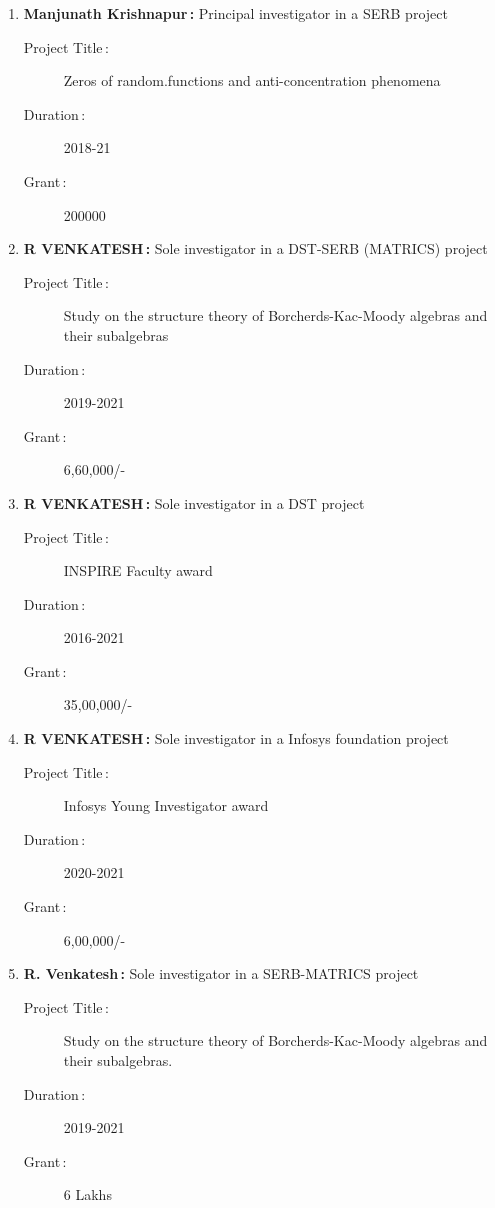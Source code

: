 \begin{enumerate}
\item {\bf Manjunath Krishnapur\,:} Principal investigator in a SERB project
\begin{description}
  \item[Project Title\,:] Zeros of random.functions and anti-concentration phenomena
  \item[Duration\,:] 2018-21
  \item[Grant\,:] 200000
\end{description}


\item {\bf R VENKATESH\,:} Sole investigator in a DST-SERB (MATRICS) project
\begin{description}
  \item[Project Title\,:] Study on the structure theory of Borcherds-Kac-Moody algebras and their subalgebras
  \item[Duration\,:] 2019-2021
  \item[Grant\,:] 6,60,000/-
\end{description}


\item {\bf R VENKATESH\,:} Sole investigator in a DST project
\begin{description}
  \item[Project Title\,:] INSPIRE Faculty award
  \item[Duration\,:] 2016-2021
  \item[Grant\,:] 35,00,000/-
\end{description}


\item {\bf R VENKATESH\,:} Sole investigator in a Infosys foundation project
\begin{description}
  \item[Project Title\,:] Infosys Young Investigator award 
  \item[Duration\,:] 2020-2021
  \item[Grant\,:] 6,00,000/-
\end{description}


\item {\bf R. Venkatesh\,:} Sole investigator in a  SERB-MATRICS project
\begin{description}
  \item[Project Title\,:] Study on the structure theory of Borcherds-Kac-Moody algebras and their subalgebras.
  \item[Duration\,:] 2019-2021
  \item[Grant\,:] 6 Lakhs
\end{description}



\end{enumerate}
